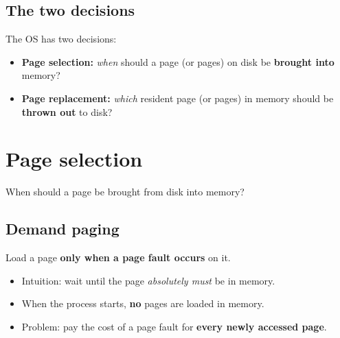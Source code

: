 \documentclass[11pt,a4paper]{article}
\begin{document}
\subsection{The two decisions}
The OS has two decisions:
\begin{itemize}
  \item \textbf{Page selection:} \emph{when} should a page (or pages) on
        disk be \textbf{brought into} memory?
  \item \textbf{Page replacement:} \emph{which} resident page (or pages) in
        memory should be \textbf{thrown out} to disk?
\end{itemize}

\section{Page selection}

When should a page be brought from disk into memory?

\subsection{Demand paging}
\begin{defbox}
Load a page \textbf{only when a page fault occurs} on it.
\end{defbox}
\begin{itemize}
  \item Intuition: wait until the page \emph{absolutely must} be in memory.
  \item When the process starts, \textbf{no} pages are loaded in memory.
  \item Problem: pay the cost of a page fault for \textbf{every newly
        accessed page}.
\end{itemize}
\end{document}
